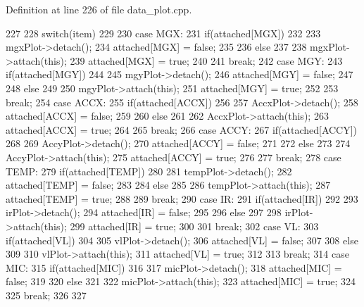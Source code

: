 Definition at line 226 of file data\_\-plot.cpp.




\begin{DoxyCode}
227 {
228     switch(item)
229     {
230     case MGX:
231         if(attached[MGX])
232         {
233             mgxPlot->detach();
234             attached[MGX] = false;
235         }
236         else
237         {
238             mgxPlot->attach(this);
239             attached[MGX] = true;
240         }
241         break;
242     case MGY:
243         if(attached[MGY])
244         {
245             mgyPlot->detach();
246             attached[MGY] = false;
247         }
248         else
249         {
250             mgyPlot->attach(this);
251             attached[MGY] = true;
252         }
253         break;
254     case ACCX:
255         if(attached[ACCX])
256         {
257             AccxPlot->detach();
258             attached[ACCX] = false;
259         }
260         else
261         {
262             AccxPlot->attach(this);
263             attached[ACCX] = true;
264         }
265         break;
266     case ACCY:
267         if(attached[ACCY])
268         {
269             AccyPlot->detach();
270             attached[ACCY] = false;
271         }
272         else
273         {
274             AccyPlot->attach(this);
275             attached[ACCY] = true;
276         }
277         break;
278     case TEMP:
279         if(attached[TEMP])
280         {
281             tempPlot->detach();
282             attached[TEMP] = false;
283         }
284         else
285         {
286             tempPlot->attach(this);
287             attached[TEMP] = true;
288         }
289         break;
290     case IR:
291         if(attached[IR])
292         {
293             irPlot->detach();
294             attached[IR] = false;
295         }
296         else
297         {
298             irPlot->attach(this);
299             attached[IR] = true;
300         }
301         break;
302     case VL:
303         if(attached[VL])
304         {
305             vlPlot->detach();
306             attached[VL] = false;
307         }
308         else
309         {
310             vlPlot->attach(this);
311             attached[VL] = true;
312         }
313         break;
314     case MIC:
315         if(attached[MIC])
316         {
317             micPlot->detach();
318             attached[MIC] = false;
319         }
320         else
321         {
322             micPlot->attach(this);
323             attached[MIC] = true;
324         }
325         break;
326     }
327 }
\end{DoxyCode}




